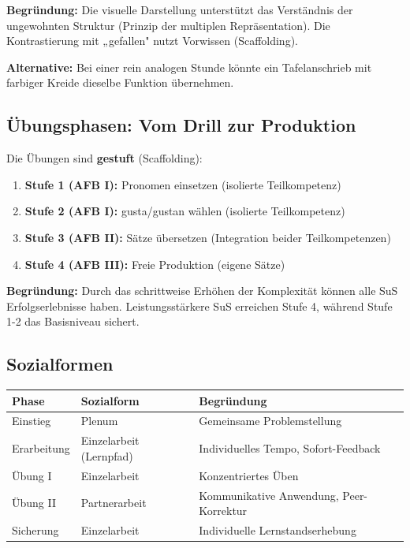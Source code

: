 \documentclass[11pt, a4paper]{article}
\begin{document}
\textbf{Begründung:} Die visuelle Darstellung unterstützt das Verständnis der ungewohnten Struktur (Prinzip der multiplen Repräsentation). Die Kontrastierung mit „gefallen" nutzt Vorwissen (Scaffolding).

\textbf{Alternative:} Bei einer rein analogen Stunde könnte ein Tafelanschrieb mit farbiger Kreide dieselbe Funktion übernehmen.

\subsection{Übungsphasen: Vom Drill zur Produktion}

Die Übungen sind \textbf{gestuft} (Scaffolding):

\begin{enumerate}[leftmargin=2em]
    \item \textbf{Stufe 1 (AFB I):} Pronomen einsetzen (isolierte Teilkompetenz)
    \item \textbf{Stufe 2 (AFB I):} gusta/gustan wählen (isolierte Teilkompetenz)
    \item \textbf{Stufe 3 (AFB II):} Sätze übersetzen (Integration beider Teilkompetenzen)
    \item \textbf{Stufe 4 (AFB III):} Freie Produktion (eigene Sätze)
\end{enumerate}

\textbf{Begründung:} Durch das schrittweise Erhöhen der Komplexität können alle SuS Erfolgserlebnisse haben. Leistungsstärkere SuS erreichen Stufe 4, während Stufe 1-2 das Basisniveau sichert.

\subsection{Sozialformen}

\begin{center}
\begin{tabular}{|l|l|l|}
    \hline
    \textbf{Phase} & \textbf{Sozialform} & \textbf{Begründung} \\
    \hline
    Einstieg & Plenum & Gemeinsame Problemstellung \\
    \hline
    Erarbeitung & Einzelarbeit (Lernpfad) & Individuelles Tempo, Sofort-Feedback \\
    \hline
    Übung I & Einzelarbeit & Konzentriertes Üben \\
    \hline
    Übung II & Partnerarbeit & Kommunikative Anwendung, Peer-Korrektur \\
    \hline
    Sicherung & Einzelarbeit & Individuelle Lernstandserhebung \\
    \hline
\end{tabular}
\end{center}
\end{document}
